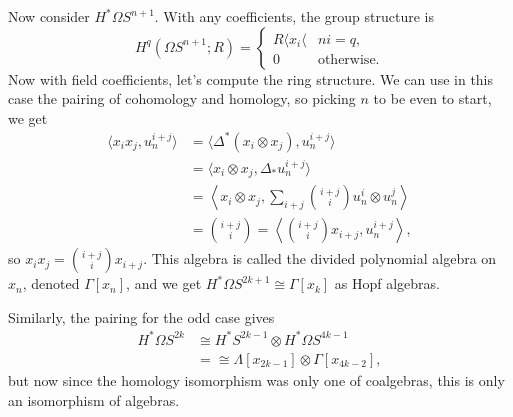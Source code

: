 \documentclass{article}
\newcommand{\Loops}{\Omega}
\begin{document}
Now consider $H^* \Loops S^{n+1}$.  With any coefficients, the group structure is
\[
H^q(\Loops S^{n+1}; R) = \begin{cases} R \langle x_i \langle & ni = q, \\ 0 & \mathrm{otherwise}. \end{cases}
\]
Now with field coefficients, let's compute the ring structure.  We can use in this case the pairing of cohomology and homology, so picking $n$ to be even to start, we get
\begin{align*}
\langle x_i x_j, u_n^{i+j} \rangle & = \langle \Delta^*(x_i \otimes x_j), u_n^{i+j} \rangle \\
& = \langle x_i \otimes x_j, \Delta_* u_n^{i+j} \rangle \\
& = \left\langle x_i \otimes x_j, \sum_{i+j} \binom{i+j}{i} u_n^i \otimes u_n^j \right\rangle \\
& = \binom{i+j}{i} = \left\langle \binom{i+j}{i} x_{i+j}, u_n^{i+j} \right\rangle,
\end{align*}
so $x_i x_j = \binom{i+j}{i} x_{i+j}$.  This algebra is called the divided polynomial algebra on $x_n$, denoted $\Gamma[x_n]$, and we get $H^* \Loops S^{2k+1} \cong \Gamma[x_k]$ as Hopf algebras.

Similarly, the pairing for the odd case gives
\begin{align*}
H^* \Loops S^{2k} & \cong H^* S^{2k-1} \otimes H^* \Loops S^{4k-1} \\
& = \cong \Lambda[x_{2k-1}] \otimes \Gamma[x_{4k-2}],
\end{align*}
but now since the homology isomorphism was only one of coalgebras, this is only an isomorphism of algebras.

\fi
\end{document}
